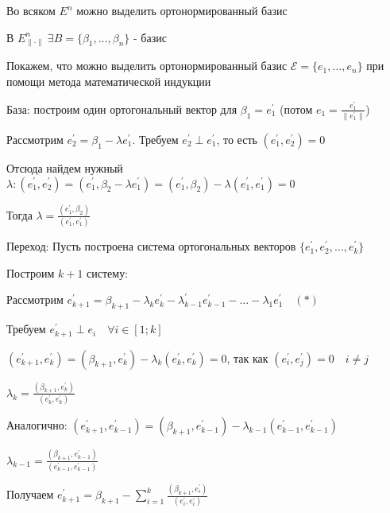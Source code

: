 \documentclass[12pt]{article}
\begin{document}
    \hypertarget{orthogonalbasisinspace}{}

    \begin{MyTheorem}
        \Ths Во всяком $E^n$ можно выделить ортонормированный базис
    \end{MyTheorem}

    \begin{MyProof}
        В $E^n_{\|\cdot\|} \ \exists B = \{\beta_1, \dots, \beta_n\}$ - базис

        Покажем, что можно выделить ортонормированный базис $\mathcal{E} = \{e_1, \dots, e_n\}$ при помощи метода
        математической индукции

        База: построим один ортогональный вектор для $\beta_1 = e_1^\prime$ (потом $e_1 = \frac{e_1^\prime}{\|e_1^\prime\|}$)

        Рассмотрим $e_2^\prime = \beta_1 - \lambda e^\prime_1$. Требуем $e_2^\prime \perp e_1^\prime$, то есть $(e_1^\prime, e_2^\prime) = 0$

        Отсюда найдем нужный $\lambda: (e_1^\prime, e_2^\prime) = (e_1^\prime, \beta_2 - \lambda e_1^\prime) = (e_1^\prime, \beta_2) - \lambda (e_1^\prime, e_1^\prime) = 0$

        Тогда $\lambda = \frac{(e_1^\prime, \beta_2)}{(e_1^\prime, e_1^\prime)}$

        Переход: Пусть построена система ортогональных векторов $\{e_1^\prime, e_2^\prime, \dots, e_k^\prime\}$

        Построим $k + 1$ систему:

        Рассмотрим $e_{k+1}^\prime = \beta_{k + 1} - \lambda_k e_k^\prime - \lambda_{k - 1}^\prime e_{k - 1}^\prime - \dots - \lambda_1 e_1^\prime \quad (*)$

        Требуем $e_{k+1}^\prime \perp e_i \quad \forall i \in [1;k]$

        $(e_{k+1}^\prime, e_k^\prime) = (\beta_{k + 1}, e_k^\prime) - \lambda_k (e_k^\prime, e_k^\prime) = 0$, так как $(e_i^\prime, e_j^\prime) = 0 \quad i \neq j$

        $\lambda_k = \frac{(\beta_{k + 1}, e_k^\prime)}{(e_k^\prime, e_k^\prime)}$

        Аналогично: $(e_{k+1}^\prime, e_{k - 1}^\prime) = (\beta_{k+1}, e_{k - 1}^\prime) - \lambda_{k - 1}(e_{k - 1}^\prime, e_{k-1}^\prime)$

        $\lambda_{k - 1} = \frac{(\beta_{k + 1}, e_{k - 1}^\prime)}{(e_{k - 1}^\prime, e_{k - 1}^\prime)}$

        Получаем $e_{k+1}^\prime = \beta_{k + 1} - \sum_{i = 1}^k \frac{(\beta_{k + 1}, e_{i}^\prime)}{(e_{i}^\prime, e_{i}^\prime)}$
    \end{MyProof}
\end{document}
